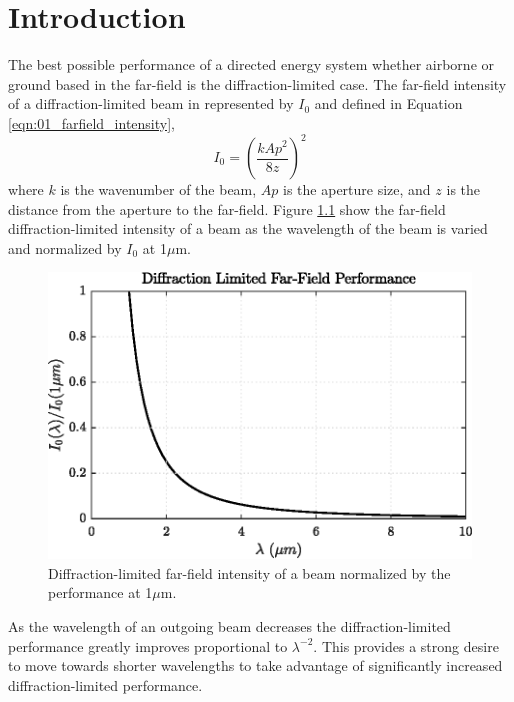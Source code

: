 
\chapter{Introduction}
The best possible performance of a directed energy system whether airborne or ground based in the far-field is the diffraction-limited case.
The far-field intensity of a diffraction-limited beam in represented by $I_0$ and defined in Equation \ref{eqn:01_farfield_intensity},
\begin{equation}
  I_0 = \left(\frac{kAp^2}{8z}\right)^2
  \label{eqn:01_farfield_intensity}
\end{equation}
where $k$ is the wavenumber of the beam, $Ap$ is the aperture size, and $z$ is the distance from the aperture to the far-field.
Figure \ref{fig:01_farfield_intensity} show the far-field diffraction-limited intensity of a beam as the wavelength of the beam is varied and normalized by $I_0$ at 1$\mu$m.
\begin{figure}
  \centering
  \includegraphics{../matlab/01_introduction/farfield_intensity.eps}
  \caption{Diffraction-limited far-field intensity of a beam normalized by the performance at 1$\mu$m.}
  \label{fig:01_farfield_intensity}
\end{figure}
As the wavelength of an outgoing beam decreases the diffraction-limited performance greatly improves proportional to $\lambda^{-2}$.
This provides a strong desire to move towards shorter wavelengths to take advantage of significantly increased diffraction-limited performance.

